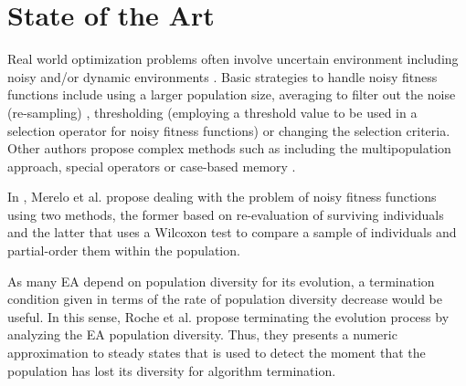 \documentclass[runningheads,a4paper]{llncs}
\begin{document}
%
%
\section{State of the Art}
\label{sec:SoA}

Real world optimization problems often involve uncertain environment including noisy and/or dynamic environments \cite{Jin2005303,QianYZ13}.
Basic strategies to handle noisy fitness functions include using a larger population size, averaging to filter out the noise (re-sampling) \cite{Branke98,Branke2001}, thresholding (employing a threshold value to be used in a selection operator for noisy fitness functions) \cite{Markon2001} or changing the selection criteria.
Other authors propose complex methods such as including the multipopulation approach, special operators or case-based memory \cite{BhattacharyaIM14}. 



In \cite{merelo14:noisy}, Merelo et al. propose dealing with the problem of noisy fitness functions using two methods, the former based on re-evaluation of surviving individuals and the latter that uses a Wilcoxon test to compare a sample of individuals and partial-order them within the population.


As many EA depend on population diversity for its evolution, a termination condition given in terms of the rate of population diversity decrease would be useful. 
In this sense, Roche et al. \cite{RocheTermination13} propose terminating the evolution process by analyzing the EA population diversity. Thus, they presents a numeric approximation to steady states that is used to detect the moment that the population has lost its diversity for algorithm termination.
\end{document}
